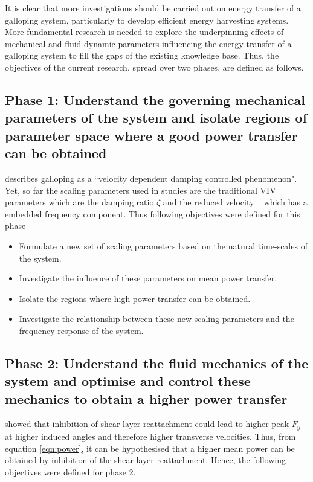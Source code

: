 It is clear that more investigations should be carried out on energy transfer of a galloping system, particularly to develop efficient energy harvesting systems. More fundamental research is needed to explore the underpinning effects of mechanical and fluid dynamic parameters influencing the energy transfer of a galloping system to fill the gaps of the existing knowledge base. Thus, the objectives of the current research, spread over two phases, are defined as follows.
 
 \subsection*{Phase 1: Understand the governing mechanical parameters of the system and isolate regions of parameter space where a good power transfer can be obtained}
 
 \citet{Paidoussis2010} describes galloping as a ``velocity dependent damping controlled phenomenon". Yet, so far the scaling parameters used in studies are the traditional VIV parameters which are the damping ratio $\zeta$ and the reduced velocity \ustar\ \citep{Barrero-Gil2010a} which has a embedded frequency component. Thus following objectives were defined for this phase 
 
 \begin{itemize}
\item Formulate a new set of scaling parameters based on the natural time-scales of the system.
\item Investigate the influence of these parameters on mean power transfer.
\item Isolate the regions where high power transfer can be obtained.
\item Investigate the relationship between these new scaling parameters and the frequency response of the system. 
 \end{itemize}
 
    
  \subsection*{Phase 2: Understand the fluid mechanics of the system and optimise and control these mechanics to obtain a higher power transfer}
  
  \citet{Luo1994} showed that inhibition of shear layer reattachment could lead to higher peak $F_{y}$ at higher induced angles and therefore higher transverse velocities. Thus, from equation \ref{eqn:power}, it can be hypothesised that a higher mean power can be obtained by inhibition of the shear layer reattachment. Hence, the following objectives were defined for phase 2. 
  
